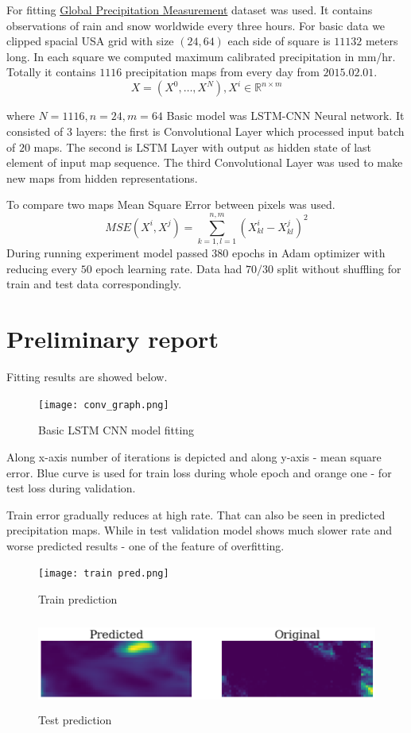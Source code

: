 \documentclass{article}
\begin{document}
For fitting \href{https://developers.google.com/earth-engine/datasets/catalog/NASA_GPM_L3_IMERG_V06#description}{Global Precipitation  Measurement} dataset was used. It contains observations of rain and snow worldwide every three hours. For basic data we clipped spacial USA grid with size $(24,64)$ each side of square is $11132$ meters long. In each square we computed maximum calibrated precipitation  in mm/hr. Totally it contains $1116$ precipitation maps from every day from $2015.02.01$.
$$X = (X^0, \dots, X^N), X^i \in \mathbb{R}^{n\times m }$$

where $N = 1116, n  = 24 , m= 64$
Basic model was LSTM-CNN Neural network. It consisted of $3$ layers: the first is Convolutional Layer which processed input batch of $20$ maps. The second is LSTM Layer with output as hidden state of last element of input map sequence. The third  Convolutional Layer was used to make new maps from hidden representations.

To compare two maps Mean Square Error between pixels was used.
$$MSE(X^i, X^j) = \sum \limits_{k = 1 ,l =1}^{n,m} (X^i_{kl} - X^j_{kl})^2$$
During running experiment model passed $380$ epochs in Adam optimizer with reducing every $50$ epoch learning rate. Data had $70/30$ split without shuffling  for train and test data correspondingly.  
\section{Preliminary report}

Fitting results are showed below. 
\begin{figure}[h!] 
\centering
\texttt{[image: conv\_graph.png]}
\caption{ Basic LSTM CNN model fitting\label{overflow}}
\end{figure}

Along x-axis number of iterations is depicted and along y-axis -  mean square error. Blue curve is used for train loss during whole epoch and orange one - for test loss during validation.

Train error gradually reduces at high rate. That can also be seen in predicted precipitation maps. While in test validation model shows much slower rate and worse predicted results - one of the feature of overfitting. 

\begin{figure}[h] 
\centering
\texttt{[image: train pred.png]}
\caption{ Train prediction\label{overflow}}
\end{figure}

\begin{figure}[h] 
\centering
\includegraphics[height=3cm]{test pred.png}
\caption{ Test prediction\label{overflow}}
\end{figure}
\end{document}
